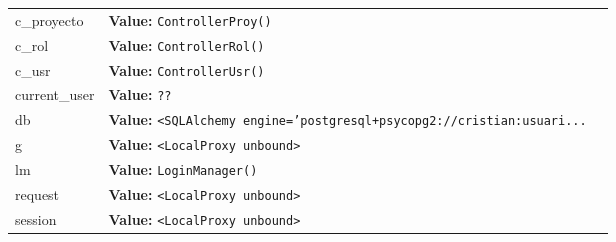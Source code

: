 \begin{longtable}{|p{\varnamewidth}|p{\vardescrwidth}|l}
\cline{1-2}
\raggedright c\-\_\-p\-r\-o\-y\-e\-c\-t\-o\- & \raggedright \textbf{Value:} 
{\tt ControllerProy()}&\\
\cline{1-2}
\raggedright c\-\_\-r\-o\-l\- & \raggedright \textbf{Value:} 
{\tt ControllerRol()}&\\
\cline{1-2}
\raggedright c\-\_\-u\-s\-r\- & \raggedright \textbf{Value:} 
{\tt ControllerUsr()}&\\
\cline{1-2}
\raggedright c\-u\-r\-r\-e\-n\-t\-\_\-u\-s\-e\-r\- & \raggedright \textbf{Value:} 
{\tt \texttt{??}}&\\
\cline{1-2}
\raggedright d\-b\- & \raggedright \textbf{Value:} 
{\tt {\textless}SQLAlchemy engine='postgresql+psycopg2://cristian:usuari\texttt{...}}&\\
\cline{1-2}
\raggedright g\- & \raggedright \textbf{Value:} 
{\tt {\textless}LocalProxy unbound{\textgreater}}&\\
\cline{1-2}
\raggedright l\-m\- & \raggedright \textbf{Value:} 
{\tt LoginManager()}&\\
\cline{1-2}
\raggedright r\-e\-q\-u\-e\-s\-t\- & \raggedright \textbf{Value:} 
{\tt {\textless}LocalProxy unbound{\textgreater}}&\\
\cline{1-2}
\raggedright s\-e\-s\-s\-i\-o\-n\- & \raggedright \textbf{Value:} 
{\tt {\textless}LocalProxy unbound{\textgreater}}&\\
\cline{1-2}
\end{longtable}

